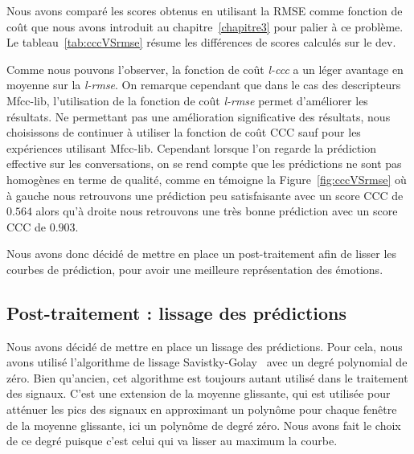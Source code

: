 Nous avons comparé les scores obtenus en utilisant la RMSE comme fonction de coût que nous avons introduit au chapitre~\ref{chapitre3} pour palier à ce problème. Le tableau~\ref{tab:cccVSrmse} résume les différences de scores calculés sur le dev.

Comme nous pouvons l'observer, la fonction de coût \textit{l-ccc} a un léger avantage en moyenne sur la \textit{l-rmse}. On remarque cependant que dans le cas des descripteurs Mfcc-lib, l'utilisation de la fonction de coût \textit{l-rmse} permet d'améliorer les résultats. Ne permettant pas une amélioration significative des résultats, nous choisissons de continuer à utiliser la fonction de coût CCC sauf pour les expériences utilisant Mfcc-lib. Cependant lorsque l'on regarde la prédiction effective sur les conversations, on se rend compte que les prédictions ne sont pas homogènes en terme de qualité, comme en témoigne la Figure~\ref{fig:cccVSrmse} où à gauche nous retrouvons une prédiction peu satisfaisante avec un score CCC de $0.564$ alors qu'à droite nous retrouvons une très bonne prédiction avec un score CCC de $0.903$.


Nous avons donc décidé de mettre en place un post-traitement afin de lisser les courbes de prédiction, pour avoir une meilleure représentation des émotions.

\subsection{Post-traitement : lissage des prédictions}
\label{sec:5.5.3}
Nous avons décidé de mettre en place un lissage des prédictions. Pour cela, nous avons utilisé l'algorithme de lissage Savistky-Golay~\cite{Savitzky1964} avec un degré polynomial de zéro. Bien qu'ancien, cet algorithme est toujours autant utilisé dans le traitement des signaux. C'est une extension de la moyenne glissante, qui est utilisée pour atténuer les pics des signaux en approximant un polynôme pour chaque fenêtre de la moyenne glissante, ici un polynôme de degré zéro. Nous avons fait le choix de ce degré puisque c'est celui qui va lisser au maximum la courbe.

